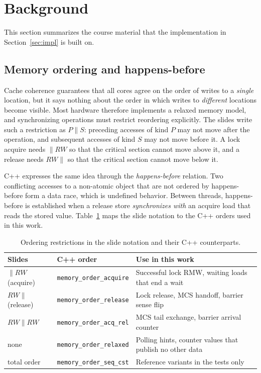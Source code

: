 \newpage
\section{Background}\label{sec:background}

This section summarizes the course material\cite{r2} that the implementation in Section~\ref{sec:impl} is built on.

\subsection{Memory ordering and happens-before}

Cache coherence guarantees that all cores agree on the order of writes to a \emph{single} location, but it says nothing about the order in which writes to \emph{different} locations become visible. Most hardware therefore implements a relaxed memory model, and synchronizing operations must restrict reordering explicitly. The slides write such a restriction as $P\|S$: preceding accesses of kind $P$ may not move after the operation, and subsequent accesses of kind $S$ may not move before it. A lock acquire needs $\|RW$ so that the critical section cannot move above it, and a release needs $RW\|$ so that the critical section cannot move below it.

C++ expresses the same idea through the \emph{happens-before} relation. Two conflicting accesses to a non-atomic object that are not ordered by happens-before form a data race, which is undefined behavior. Between threads, happens-before is established when a release store \emph{synchronizes with} an acquire load that reads the stored value. Table~\ref{tab:orders} maps the slide notation to the C++ orders used in this work.

\begin{table}[H]
\centering
\small
\caption{Ordering restrictions in the slide notation and their C++ counterparts.}\label{tab:orders}
\begin{tabular}{|>{\raggedright\arraybackslash}p{}|>{\raggedright\arraybackslash}p{}|>{\raggedright\arraybackslash}p{}|}
\hline
\textbf{Slides} & \textbf{C++ order} & \textbf{Use in this work} \\ \hline
$\|RW$ (acquire) & \texttt{memory\_order\_acquire} & Successful lock RMW, waiting loads that end a wait \\ \hline
$RW\|$ (release) & \texttt{memory\_order\_release} & Lock release, MCS handoff, barrier sense flip \\ \hline
$RW\|RW$ & \texttt{memory\_order\_acq\_rel} & MCS tail exchange, barrier arrival counter \\ \hline
none & \texttt{memory\_order\_relaxed} & Polling hints, counter values that publish no other data \\ \hline
total order & \texttt{memory\_order\_seq\_cst} & Reference variants in the tests only \\ \hline
\end{tabular}
\end{table}

